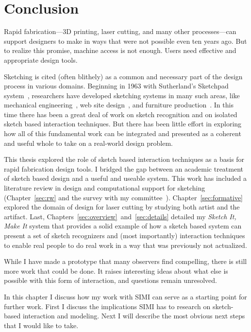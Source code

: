 \chapter{Conclusion}

Rapid fabrication---3D printing, laser cutting, and many other
processes---can support designers to make in ways that were not
possible even ten years ago. But to realize this promise, machine
access is not enough. Users need effective and appropriate design
tools. 

Sketching is cited (often blithely) as a common and necessary part of
the design process in various domains. Beginning in 1963 with
Sutherland's Sketchpad system~\cite{sutherland-sketchpad}, researchers
have developed sketching systems in many such areas, like mechanical
engineering~\cite{lipson-correlation}, web site
design~\cite{lin-denim}, and furniture
production~\cite{oh-fab,saul-sketch-chair}. In this time there has
been a great deal of work on sketch recognition and on isolated sketch
based interaction techniques. But there has been little effort in
exploring how all of this fundamental work can be integrated and
presented as a coherent and useful whole to take on a real-world
design problem.

This thesis explored the role of sketch based interaction techniques
as a basis for rapid fabrication design tools. I bridged the gap
between an academic treatment of sketch based design and a useful and
useable system. This work has included a literature review in design
and computational support for sketching (Chapter~\ref{sec:rw} and the
survey with my
committee~\cite{johnson-sketch-review}). Chapter~\ref{sec:formative}
explored the domain of design for laser cutting by studying both
artist and the artifact. Last,
Chapters~\ref{sec:overview}~and~\ref{sec:details} detailed my
\textit{Sketch It, Make It} system that provides a solid example of
how a sketch based system can present a set of sketch recognizers and
(most importantly) interaction techniques to enable real people to do
real work in a way that was previously not actualized.

While I have made a prototype that many observers find compelling,
there is still more work that could be done. It raises interesting
ideas about what else is possible with this form of interaction,
and questions remain unresolved.

In this chapter I discuss how my work with SIMI can serve as a
starting point for further work. First I discuss the implications SIMI
has to research on sketch-based interaction and modeling. Next I will
describe the most obvious next steps that I would like to take.

